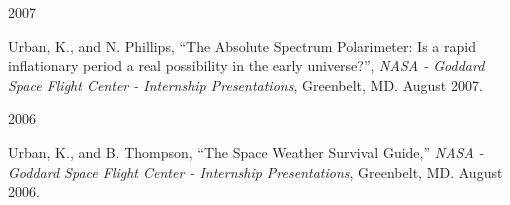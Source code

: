 \begin{center} \Large{2007} \end{center}
\normalsize
\begin{itemize*}
  \item 
    Urban, K., and N. Phillips, ``The Absolute Spectrum Polarimeter: Is a rapid inflationary period
    a real possibility in the early universe?'',
    {\em NASA - Goddard Space Flight Center - Internship Presentations},
    Greenbelt, MD. August 2007.
\end{itemize*}

\begin{center} \Large{2006} \end{center}
\normalsize
\begin{itemize*}
  \item 
    Urban, K., and B. Thompson, 
    ``The Space Weather Survival Guide,''
    {\em NASA - Goddard Space Flight Center - Internship Presentations},
    Greenbelt, MD. August 2006.
\end{itemize*}

